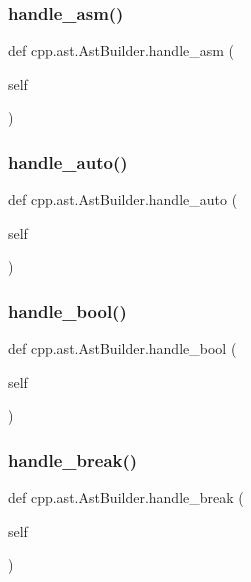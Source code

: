 \subsubsection{\texorpdfstring{handle\_asm()}{handle\_asm()}}
{\footnotesize\ttfamily def cpp.\+ast.\+Ast\+Builder.\+handle\+\_\+asm (\begin{DoxyParamCaption}\item[{}]{self }\end{DoxyParamCaption})}

\mbox{\label{classcpp_1_1ast_1_1AstBuilder_a0cb490894f17a6c34fbe6bb8f7a2e626}} 
\subsubsection{\texorpdfstring{handle\_auto()}{handle\_auto()}}
{\footnotesize\ttfamily def cpp.\+ast.\+Ast\+Builder.\+handle\+\_\+auto (\begin{DoxyParamCaption}\item[{}]{self }\end{DoxyParamCaption})}

\mbox{\label{classcpp_1_1ast_1_1AstBuilder_ac5a5e19e5be6501d351891cc0ead5f53}} 
\subsubsection{\texorpdfstring{handle\_bool()}{handle\_bool()}}
{\footnotesize\ttfamily def cpp.\+ast.\+Ast\+Builder.\+handle\+\_\+bool (\begin{DoxyParamCaption}\item[{}]{self }\end{DoxyParamCaption})}

\mbox{\label{classcpp_1_1ast_1_1AstBuilder_a2b663a3e15e70b9d85bf17afb2bcf07a}} 
\subsubsection{\texorpdfstring{handle\_break()}{handle\_break()}}
{\footnotesize\ttfamily def cpp.\+ast.\+Ast\+Builder.\+handle\+\_\+break (\begin{DoxyParamCaption}\item[{}]{self }\end{DoxyParamCaption})}

